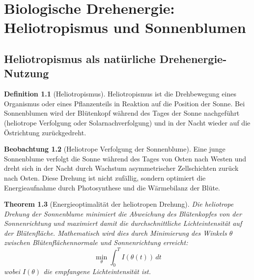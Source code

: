 \documentclass[12pt,a4paper]{report}
\theoremstyle{plain}
\newtheorem{theorem}{Theorem}[section]
\theoremstyle{definition}
\newtheorem{definition}[theorem]{Definition}
\newtheorem{beobachtung}[theorem]{Beobachtung}
\theoremstyle{remark}
\begin{document}
\chapter{Biologische Drehenergie: Heliotropismus und Sonnenblumen}

\section{Heliotropismus als natürliche Drehenergie-Nutzung}

\begin{definition}[Heliotropismus]
	Heliotropismus ist die Drehbewegung eines Organismus oder eines Pflanzenteils in Reaktion auf die Position der Sonne. Bei Sonnenblumen wird der Blütenkopf während des Tages der Sonne nachgeführt (heliotrope Verfolgung oder Solarnachverfolgung) und in der Nacht wieder auf die Östrichtung zurückgedreht.
\end{definition}

\begin{beobachtung}[Heliotrope Verfolgung der Sonnenblume]
	Eine junge Sonnenblume verfolgt die Sonne während des Tages von Osten nach Westen und dreht sich in der Nacht durch Wachstum asymmetrischer Zellschichten zurück nach Osten. Diese Drehung ist nicht zufällig, sondern optimiert die Energieaufnahme durch Photosynthese und die Wärmebilanz der Blüte.
\end{beobachtung}

\begin{theorem}[Energieoptimalität der heliotropen Drehung]
	\label{thm:heliotropie_optimal}
	Die heliotrope Drehung der Sonnenblume minimiert die Abweichung des Blütenkopfes von der Sonnenrichtung und maximiert damit die durchschnittliche Lichteintensität auf der Blütenfläche. Mathematisch wird dies durch Minimierung des Winkels $\theta$ zwischen Blütenflächennormale und Sonnenrichtung erreicht:
	\[
	\min_{\theta} \int_0^T I(\theta(t)) \, dt
	\]
	wobei $I(\theta)$ die empfangene Lichteintensität ist.
\end{theorem}
\end{document}
